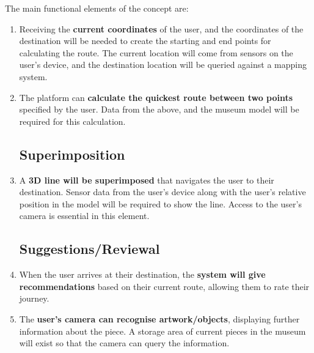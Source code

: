 
The main functional elements of the concept are:

\begin{enumerate}
\subsection*{Route Calculations}
    \item Receiving the \textbf{current coordinates} of the user, and the coordinates of the destination will be needed to create the starting and end points for calculating the route. The current location will come from sensors on the user's device, and the destination location will be queried against a mapping system.
    \item The platform can \textbf{calculate the quickest route between two points} specified by the user. Data from the above, and the museum model will be required for this calculation.

\subsection*{Superimposition}
    \item A \textbf{3D line will be superimposed} that navigates the user to their destination. Sensor data from the user's device along with the user's relative position in the model will be required to show the line. Access to the user's camera is essential in this element.

\subsection*{Suggestions/Reviewal}
    \item When the user arrives at their destination, the \textbf{system will give recommendations} based on their current route, allowing them to rate their journey.
    \item The \textbf{user's camera can recognise artwork/objects}, displaying further information about the piece. A storage area of current pieces in the museum will exist so that the camera can query the information.
\end{enumerate}
